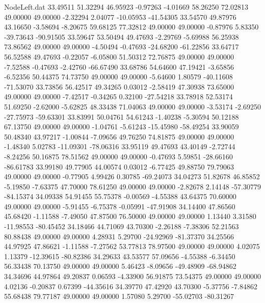 \begin{filecontents}{NodeLeft.dat}
  33.49511   51.32294   46.95923    -0.97263   -4.01669   58.26250   72.02813   49.00000   49.00000   -2.32294    2.04077  -10.05953  -41.54305
  33.54570   49.87976   43.16650    -3.58694   -8.20675   59.68125   77.32812   49.00000   49.00000   -0.87976    5.83350  -39.73643  -90.91505
  33.59647   53.50494   49.47693    -2.29769   -5.69988   56.25938   73.86562   49.00000   49.00000   -4.50494   -0.47693  -24.68200  -61.22856
  33.64717   56.52588   49.47693    -0.22057   -6.05800   51.50312   72.76875   49.00000   49.00000   -7.52588   -0.47693   -2.42760  -66.67490
  33.68786   54.64600   47.19421    -3.65856   -6.52356   50.44375   74.73750   49.00000   49.00000   -5.64600    1.80579  -40.11608  -71.53070
  33.73856   56.42517   49.34265     0.03012   -2.58419   47.30938   73.65000   49.00000   49.00000   -7.42517   -0.34265    0.32100  -27.54218
  33.78918   52.53174   51.69250    -2.62000   -5.62825   48.33438   71.04063   49.00000   49.00000   -3.53174   -2.69250  -27.75973  -59.63301
  33.83991   50.04761   54.61243    -1.40238   -5.30594   50.12188   67.13750   49.00000   49.00000   -1.04761   -5.61243  -15.45980  -58.49254
  33.90059   50.48340   43.97217    -1.00844   -7.09656   49.76250   74.81875   49.00000   49.00000   -1.48340    5.02783  -11.09301  -78.06316
  33.95119   49.47693   43.40149    -2.72744   -8.24256   50.16875   78.51562   49.00000   49.00000   -0.47693    5.59851  -28.66160  -86.61783
  33.99180   49.77905   44.00574     0.03012   -6.77425   49.88750   79.79063   49.00000   49.00000   -0.77905    4.99426    0.30785  -69.24073
  34.04273   51.82678   46.85852    -5.19850   -7.63375   47.70000   78.61250   49.00000   49.00000   -2.82678    2.14148  -57.30779  -84.15374
  34.09338   54.91455   55.75378    -0.00569   -4.55388   43.64375   70.60000   49.00000   49.00000   -5.91455   -6.75378   -0.05991  -47.91908
  34.14400   47.86560   45.68420    -1.11588   -7.49050   47.87500   76.50000   49.00000   49.00000    1.13440    3.31580  -11.98553  -80.45452
  34.18466   44.71069   43.70300    -2.26188   -7.38306   52.21563   80.88438   49.00000   49.00000    4.28931    5.29700  -24.92969  -81.37370
  34.25566   44.97925   47.86621    -1.11588   -7.27562   53.77813   78.97500   49.00000   49.00000    4.02075    1.13379  -12.39615  -80.82386
  34.29633   43.53577   57.09656    -4.55388   -6.34450   56.33438   70.13750   49.00000   49.00000    5.46423   -8.09656  -49.48909  -68.94862
  34.34696   44.97864   49.20837     0.06593   -4.33900   56.91875   73.54375   49.00000   49.00000    4.02136   -0.20837    0.67399  -44.35616
  34.39770   47.42920   43.70300    -5.37756   -7.84862   55.68438   79.77187   49.00000   49.00000    1.57080    5.29700  -55.02703  -80.31267

\end{filecontents}
